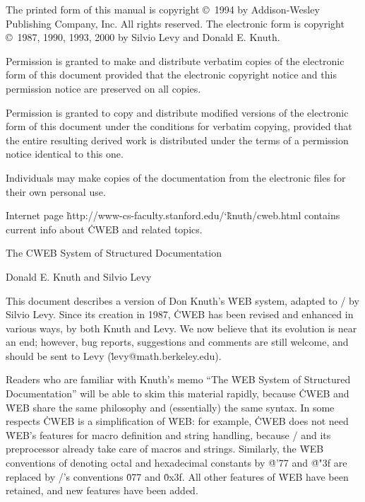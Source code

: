 \bigskip\noindent
The printed form of this manual is copyright \copyright\ 1994
  by Addison-Wesley Publishing Company, Inc.  All rights reserved.
\smallskip\noindent
The electronic form is copyright \copyright\ 1987, 1990, 1993, 2000
  by Silvio Levy and Donald E. Knuth.

\bigskip\noindent
Permission is granted to make and distribute verbatim copies of the
electronic form of this document provided that the electronic copyright
notice and this permission notice are preserved on all copies.

\smallskip\noindent
Permission is granted to copy and distribute modified versions of the
electronic form of this document under the conditions for verbatim copying,
provided that the entire resulting derived work is distributed under the terms
of a permission notice identical to this one.

\smallskip\noindent
Individuals may make copies of the documentation from the electronic files
for their own personal use.

\smallskip\noindent
Internet page \.{http://www-cs-faculty.stanford.edu/\char`\~knuth/cweb.html}
contains current info about \.{CWEB} and related topics.

 \titletrue\eject

\titletrue
\centerline{\titlefont The {\ttitlefont CWEB} System of
    Structured Documentation}

\centerline{\authorfont Donald E. Knuth and Silvio Levy}

\noindent
This document describes a version of Don Knuth's \.{WEB} system,
adapted to \CEE/ by Silvio Levy.  Since its creation in 1987, \.{CWEB}
has been revised and enhanced in various ways, by both Knuth and Levy.
We now believe that its evolution is near an end; however, bug
reports, suggestions and comments are still welcome, and
should be sent to Levy (\.{levy@math.berkeley.edu}).

Readers who are familiar with Knuth's memo ``The \.{WEB} System of Structured
Documentation'' will be able
to skim this material rapidly, because \.{CWEB} and \.{WEB} share
the same philosophy and (essentially) the same syntax.  In some respects
\.{CWEB} is a simplification
of \.{WEB}: for example, \.{CWEB} does not need \.{WEB}'s features
for macro definition and string handling, because \CEE/ and its
preprocessor already take care of macros and strings. Similarly, the \.{WEB}
conventions of denoting octal and hexadecimal constants by \.{@'77}
and \.{@"3f} are replaced by \CEE/'s conventions \.{077} and
\.{0x3f}. All other features of \.{WEB} have been
retained, and new features have been added.

